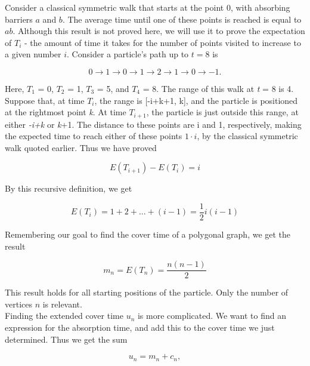 \documentclass[11pt]{article}
\begin{document}
Consider a classical symmetric walk that starts at the point 0, with absorbing barriers $a$ and $b$. The average time until one of these points is reached is equal to $ab$. Although this result is not proved here, we will use it to prove the expectation of $T_{i}$ - the amount of time it takes for the number of points visited to increase to a given number $i$. Consider a particle's path up to $t = 8$ is

\begin{equation}
0 \to 1 \to 0 \to 1 \to 2 \to 1 \to 0 \to -1.
\end{equation}

\noindent Here, $T_{1}$ = 0, $T_{2}$ = 1, $T_{3}$ = 5, and $T_{4}$ = 8. The range of this walk at \textit{t} = 8 is 4. \newline
\\
\indent Suppose that, at time $T_{i}$, the range is [-i+k+1, k], and the particle is positioned at the rightmost point \textit{k}. At time $T_{i+1}$, the particle is just outside this range, at either \textit{-i+k} or \textit{k}+1. The distance to these points are i and 1, respectively, making the expected time to reach either of these points $1 \cdot i$, by the classical symmetric walk quoted earlier. Thus we have proved 

\begin{equation}
E(T_{i+1}) - E(T_{i}) = i
\end{equation}

\noindent By this recursive definition, we get

\begin{equation}
E(T_{i}) = 1 + 2 + ... + (i-1) = \frac{1}{2}i(i-1)
\end{equation}

\noindent Remembering our goal to find the cover time of a polygonal graph, we get the result 

\begin{equation}
m_{n} = E(T_{n}) = \frac{n(n-1)}{2}
\label{eq:polygonCover}
\end{equation}

This result holds for all starting positions of the particle. Only the number of vertices $n$ is relevant.
\\

Finding the extended cover time $u_{n}$ is more complicated. We want to find an expression for the absorption time, and add this to the cover time we just determined. Thus we get the sum

\begin{equation}
u_{n} = m_{n} + c_{n},
\label{eq:polygonExCover}
\end{equation}
\end{document}
